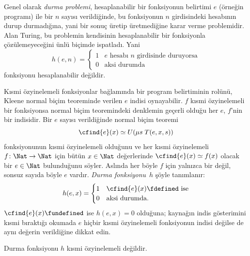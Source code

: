 \documentclass[../../../include/open-logic-section]{subfiles}
\begin{document}

Genel olarak \emph{durma problemi}, hesaplanabilir bir fonksiyonun belirtimi
$e$ (örneğin programı) ile bir $n$ sayısı verildiğinde, bu fonksiyonun $n$
girdisindeki hesabının durup durmadığına, yani bir sonuç üretip üretmediğine
karar verme problemidir. Alan Turing, bu problemin kendisinin hesaplanabilir
bir fonksiyonla çözülemeyeceğini ünlü biçimde ispatladı. Yani
\[
  h(e,n)=\begin{cases}
    1 & \text{$e$ hesabı $n$ girdisinde duruyorsa}\\
    0 & \text{aksi durumda}
  \end{cases}
\]
fonksiyonu hesaplanabilir değildir.

Kısmi özyinelemeli fonksiyonlar bağlamında bir program belirtiminin rolünü,
Kleene normal biçim teoreminde verilen $e$ indisi oynayabilir. $f$ kısmi
özyinelemeli bir fonksiyonsa normal biçim teoremindeki denklemin geçerli
olduğu her $e$, $f$'nin bir indisidir. Bir $e$ sayısı verildiğinde normal
biçim teoremi
\[
  \cfind{e}(x)\simeq U(\mu s\;T(e,x,s))
\]
fonksiyonunun kısmi özyinelemeli olduğunu ve her kısmi özyinelemeli
$f\colon\Nat\to\Nat$ için bütün $x\in\Nat$ değerlerinde
$\cfind{e}(x)\simeq f(x)$ olacak bir $e\in\Nat$ bulunduğunu söyler. Aslında
her böyle $f$ için yalnızca bir değil, sonsuz sayıda böyle $e$ vardır.
\emph{Durma fonksiyonu}~$h$ şöyle tanımlanır:
\[
  h(e,x)=\begin{cases}
    1 & \text{$\cfind{e}(x)\fdefined$ ise}\\
    0 & \text{aksi durumda.}
  \end{cases}
\]
$\cfind{e}(x)\fundefined$ ise $h(e,x)=0$ olduğuna; kaynağın indis
gösterimini kısmi bıraktığı okumada $e$ hiçbir kısmi özyinelemeli fonksiyonun
indisi değilse de aynı değerin verildiğine dikkat edin.

\begin{thm}
Durma fonksiyonu $h$ kısmi özyinelemeli değildir.
\end{thm}
\end{document}
